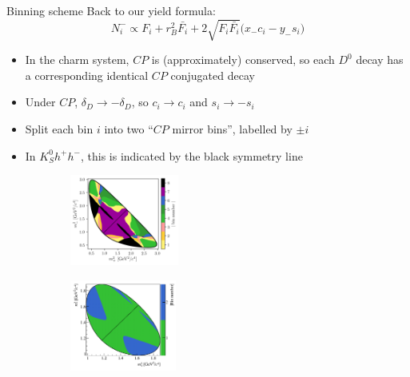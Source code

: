 \documentclass{beamer}
\begin{document}
\begin{frame}{Binning scheme}
  \vspace{0.0cm}
  {\large Back to our yield formula:}
  \begin{equation*}
    N_i^-\propto F_i + r_B^2\bar{F_i} + 2\sqrt{F_i\bar{F_i}}\big(x_-c_i - y_-s_i\big)
  \end{equation*}
  \vspace{-0.3cm}
  \begin{itemize}
    \setlength\itemsep{0.5em}
    \item{In the charm system, $C\!P$ is (approximately) conserved, so each $D^0$ decay has a corresponding identical $C\!P$ conjugated decay}
    \item{Under $C\!P$, $\delta_D\to-\delta_D$, so $c_i\to c_i$ and $s_i\to -s_i$}
    \item{Split each bin $i$ into two ``$C\!P$ mirror bins'', labelled by $\pm i$}
    \item{In $K_S^0h^+h^-$, this is indicated by the black symmetry line}
  \end{itemize}
  \begin{figure}
    \centering
    \begin{subfigure}{0.45\textwidth}
      \centering
      \includegraphics[height = 3cm]{Plots/KsPiPi_optimal.png}
    \end{subfigure}%
    \begin{subfigure}{0.45\textwidth}
      \centering
      \includegraphics[height = 3cm]{Plots/KsKK_binning.png}
    \end{subfigure}
  \end{figure}
\end{frame}
\end{document}
